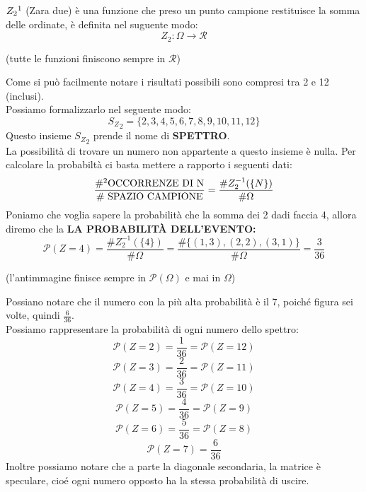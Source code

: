 $Z_2\footnotemark$ (Zara due) è una funzione che preso un punto campione restituisce la somma delle ordinate, è definita nel suguente modo:
$$ Z_2: \Omega \rightarrow \mathcal{R} $$
\centerline{(tutte le funzioni finiscono sempre in $\mathcal{R}$)}
Come si può facilmente notare i risultati possibili sono compresi tra 2 e 12 (inclusi). \\
Possiamo formalizzarlo nel seguente modo:
$$ {S_Z}_2 = \{2,3,4,5,6,7,8,9,10,11,12\} $$
Questo insieme ${S_Z}_2$ prende il nome di \textbf{SPETTRO}.\\
La possibilità di trovare un numero non appartente a questo insieme è nulla.
\newpage
Per calcolare la probabiltà ci basta mettere a rapporto i seguenti dati:
\begin{equation*}
\frac{\text{\#\footnotemark OCCORRENZE DI N}}{\text{\# SPAZIO CAMPIONE}} =
\frac{\#{Z^{-1}_2}(\{N\})}{\#\Omega}
\end{equation*}
Poniamo che voglia sapere la probabilità che la somma dei 2 dadi faccia 4, allora diremo che la \textbf{LA PROBABILITÀ DELL'EVENTO:}
\begin{equation*}
\mathcal{P}(Z=4) =
\frac{\#{Z^{-1}_2}(\{4\})}{\#\Omega} =
\frac{\# \{ (1,3),(2,2),(3,1) \} }{\#\Omega} =
\frac{3}{36}
\end{equation*}
\begin{center}
(l'antimmagine finisce sempre in $\mathcal{P}(\Omega)$ e mai in $\Omega$)
\end{center}
Possiano notare che il numero con la più alta probabilità è il 7, poiché figura sei volte, quindi $ \frac{6}{36} $.\\
Possiamo rappresentare la probabilità di ogni numero dello spettro:
$$ \mathcal{P}(Z=2) = \frac{1}{36} = \mathcal{P}(Z=12) $$
$$ \mathcal{P}(Z=3) = \frac{2}{36} = \mathcal{P}(Z=11) $$
$$ \mathcal{P}(Z=4) = \frac{3}{36} = \mathcal{P}(Z=10) $$
$$ \mathcal{P}(Z=5) = \frac{4}{36} = \mathcal{P}(Z=9)  $$
$$ \mathcal{P}(Z=6) = \frac{5}{36} = \mathcal{P}(Z=8)  $$
$$ \mathcal{P}(Z=7) = \frac{6}{36} $$
Inoltre possiamo notare che a parte la diagonale secondaria, la matrice è speculare, cioé ogni numero opposto ha la stessa probabilità di uscire.\\ %
